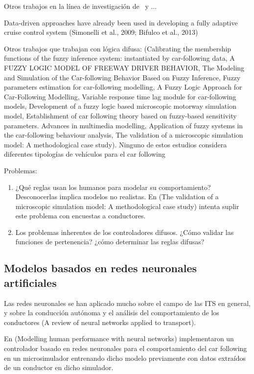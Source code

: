 Otros trabajos en la línea de investigación de~\cite{Kikuchi1992} y \cite{Chakroborty1999}
...

Data-driven approaches have already been used in developing a fully adaptive cruise control system (Simonelli et al., 2009; Bifulco et al., 2013)

Otros trabajos que trabajan con lógica difusa: (Calibrating the membership functions of the fuzzy inference system: instantiated by car-following data, A FUZZY LOGIC MODEL OF FREEWAY DRIVER BEHAVIOR, The Modeling and Simulation of the Car-following Behavior Based on Fuzzy Inference, Fuzzy parameters estimation for car-following modelling, A Fuzzy Logic Approach for Car-Following Modelling, Variable response time lag module for car-following models, Development of a fuzzy logic based microscopic motorway simulation model, Establishment of car following theory based on fuzzy-based sensitivity parameters. Advances in multimedia modelling, Application of fuzzy systems in the car-following behaviour analysis, The validation of a microscopic simulation model: A methodological case study). Ninguno de estos estudios considera diferentes tipologías de vehículos para el car following

Problemas:

\begin{enumerate}
	\item ¿Qué reglas usan los humanos para modelar su comportamiento? Desconocerlas implica modelos no realistas. En (The validation of a microscopic simulation model: A methodological case study) intenta suplir este problema con encuestas a conductores.
	\item Los problemas inherentes de los controladores difusos. ¿Cómo validar las funciones de pertenencia? ¿cómo determinar las reglas difusas?
\end{enumerate}

\subsection{Modelos basados en redes neuronales artificiales}

Las redes neuronales se han aplicado mucho sobre el campo de las ITS en general, y sobre la conducción autónoma y el análisis del comportamiento de los conductores (A review of neural networks applied to transport).

En (Modelling human performance with neural networks) implementaron un controlador basado en redes neuronales para el comportamiento del car following en un microsimulador entrenando dicho modelo previamente con datos extraídos de un conductor en dicho simulador.

